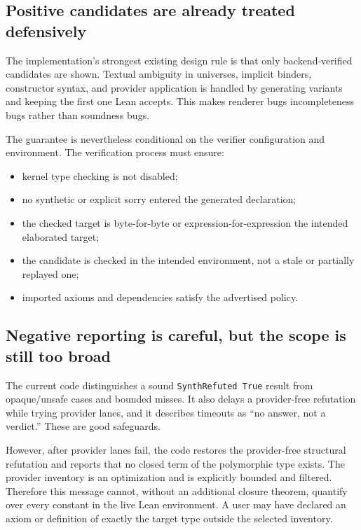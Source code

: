 \documentclass[11pt,letterpaper,openany]{report}
\theoremstyle{definition}
\theoremstyle{remark}
\newcommand{\code}[1]{\texttt{#1}}
\begin{document}
\subsection{Positive candidates are already treated defensively}

The implementation's strongest existing design rule is that only backend-verified candidates are shown. Textual ambiguity in universes, implicit binders, constructor syntax, and provider application is handled by generating variants and keeping the first one Lean accepts. This makes renderer bugs incompleteness bugs rather than soundness bugs.

The guarantee is nevertheless conditional on the verifier configuration and environment. The verification process must ensure:

\begin{itemize}
\item kernel type checking is not disabled;
\item no synthetic or explicit sorry entered the generated declaration;
\item the checked target is byte-for-byte or expression-for-expression the intended elaborated target;
\item the candidate is checked in the intended environment, not a stale or partially replayed one;
\item imported axioms and dependencies satisfy the advertised policy.
\end{itemize}

\subsection{Negative reporting is careful, but the scope is still too broad}

The current code distinguishes a sound \code{SynthRefuted True} result from opaque/unsafe cases and bounded misses. It also delays a provider-free refutation while trying provider lanes, and it describes timeouts as ``no answer, not a verdict.'' These are good safeguards.

However, after provider lanes fail, the code restores the provider-free structural refutation and reports that no closed term of the polymorphic type exists. The provider inventory is an optimization and is explicitly bounded and filtered. Therefore this message cannot, without an additional closure theorem, quantify over every constant in the live Lean environment. A user may have declared an axiom or definition of exactly the target type outside the selected inventory.
\end{document}
